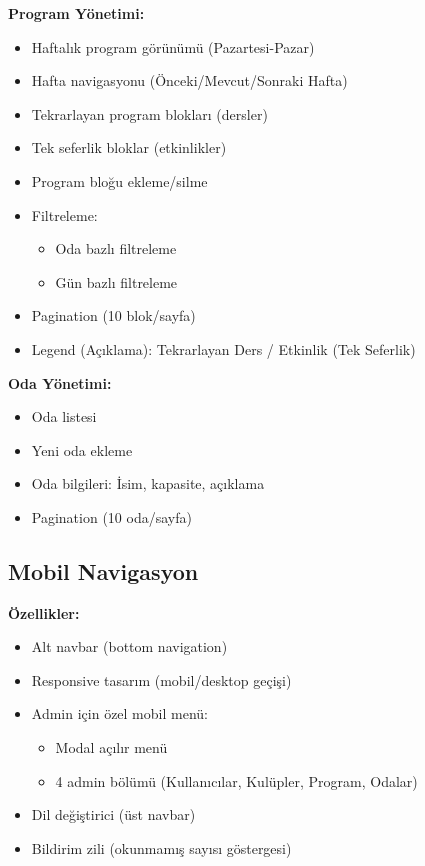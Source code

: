 \documentclass[a4paper,12pt]{report}
\begin{document}
\textbf{Program Yönetimi:}
\begin{itemize}
    \item Haftalık program görünümü (Pazartesi-Pazar)
    \item Hafta navigasyonu (Önceki/Mevcut/Sonraki Hafta)
    \item Tekrarlayan program blokları (dersler)
    \item Tek seferlik bloklar (etkinlikler)
    \item Program bloğu ekleme/silme
    \item Filtreleme:
    \begin{itemize}
        \item Oda bazlı filtreleme
        \item Gün bazlı filtreleme
    \end{itemize}
    \item Pagination (10 blok/sayfa)
    \item Legend (Açıklama): Tekrarlayan Ders / Etkinlik (Tek Seferlik)
\end{itemize}

\textbf{Oda Yönetimi:}
\begin{itemize}
    \item Oda listesi
    \item Yeni oda ekleme
    \item Oda bilgileri: İsim, kapasite, açıklama
    \item Pagination (10 oda/sayfa)
\end{itemize}

\subsection{Mobil Navigasyon}

\textbf{Özellikler:}
\begin{itemize}
    \item Alt navbar (bottom navigation)
    \item Responsive tasarım (mobil/desktop geçişi)
    \item Admin için özel mobil menü:
    \begin{itemize}
        \item Modal açılır menü
        \item 4 admin bölümü (Kullanıcılar, Kulüpler, Program, Odalar)
    \end{itemize}
    \item Dil değiştirici (üst navbar)
    \item Bildirim zili (okunmamış sayısı göstergesi)
\end{itemize}
\end{document}
